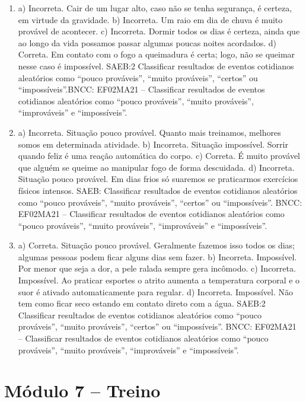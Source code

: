 \begin{enumerate}
\item
a) Incorreta. Cair de um lugar alto, caso não se tenha segurança, é certeza, em virtude da gravidade.
b) Incorreta. Um raio em dia de chuva é muito provável de acontecer.
c) Incorreta. Dormir todos os dias é certeza, ainda que ao longo da vida possamos passar algumas poucas noites acordados.
d) Correta. Em contato com o fogo a queimadura é certa; logo, não se queimar nesse caso é impossível.
SAEB:2 Classificar resultados de eventos cotidianos aleatórios como ``pouco prováveis'', ``muito prováveis'', ``certos'' ou ``impossíveis''.BNCC: EF02MA21 -- Classificar resultados de eventos cotidianos aleatórios como ``pouco prováveis'', ``muito prováveis'', ``improváveis'' e ``impossíveis''.

\item
a) Incorreta. Situação pouco provável. Quanto mais treinamos, melhores somos em determinada atividade.
b) Incorreta. Situação impossível. Sorrir quando feliz é uma reação
automática do corpo.
c) Correta. É muito provável que alguém se queime ao manipular fogo de
forma descuidada.
d) Incorreta. Situação pouco provável. Em dias frios só suaremos se
praticarmos exercícios físicos intensos.
SAEB: Classificar resultados de eventos cotidianos aleatórios como ``pouco prováveis'', ``muito prováveis'', ``certos'' ou ``impossíveis''. BNCC: EF02MA21 -- Classificar resultados de eventos cotidianos aleatórios como ``pouco prováveis'', ``muito prováveis'', ``improváveis'' e ``impossíveis''.

\item
a) Correta. Situação pouco provável. Geralmente fazemos isso todos os
dias; algumas pessoas podem ficar alguns dias sem fazer.
b) Incorreta. Impossível. Por menor que seja a dor, a pele ralada sempre gera incômodo.
c) Incorreta. Impossível. Ao praticar esportes o atrito aumenta a
temperatura corporal e o suor é ativado automaticamente para regular.
d) Incorreta. Impossível. Não tem como ficar seco estando em contato direto com a água.
SAEB:2 Classificar resultados de eventos cotidianos aleatórios como ``pouco prováveis'', ``muito prováveis'', ``certos'' ou ``impossíveis''. BNCC: EF02MA21 -- Classificar resultados de eventos cotidianos aleatórios como ``pouco prováveis'', ``muito prováveis'', ``improváveis'' e ``impossíveis''.
\end{enumerate}

\section*{Módulo 7 – Treino}

